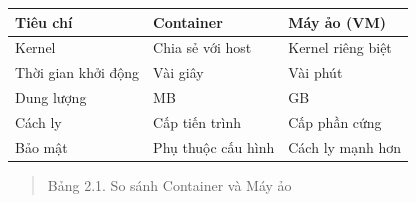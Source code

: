 {\def\LTcaptype{none}
\begin{center}
\label{tab:so-sanh-container-may-ao}
\end{center}
\begin{longtable}[]{@{}|
  >{\raggedright\arraybackslash}p{}|
  >{\centering\arraybackslash}p{}|
  >{\centering\arraybackslash}p{}|@{}}
\hline
\begin{minipage}[b]{\linewidth}\raggedright
\textbf{Tiêu chí}
\end{minipage} & \begin{minipage}[b]{\linewidth}\centering
\textbf{Container}
\end{minipage} & \begin{minipage}[b]{\linewidth}\centering
\textbf{Máy ảo (VM)}
\end{minipage} \\
\hline
\endhead
Kernel & Chia sẻ với host & Kernel riêng biệt \\
\hline
Thời gian khởi động & Vài giây & Vài phút \\
\hline
Dung lượng & MB & GB \\
\hline
Cách ly & Cấp tiến trình & Cấp phần cứng \\
\hline
Bảo mật & Phụ thuộc cấu hình & Cách ly mạnh hơn \\
\hline
\end{longtable}
}

\begin{quote}
Bảng 2.1. So sánh Container và Máy ảo
\end{quote}
